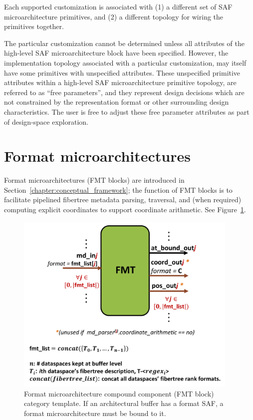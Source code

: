 Each supported customization is associated with (1) a different set of SAF microarchitecture primitives, and (2) a different topology for wiring the primitives together.

The particular customization cannot be determined unless all attributes of the high-level SAF microarchitecture block have been specified. However, the implementation topology associated with a particular customization, may itself have some primitives with unspecified attributes. These unspecified primitive attributes within a high-level SAF microarchitecture primitive topology, are referred to as ``free parameters'', and they represent design decisions which are not constrained by the representation format or other surrounding design characteristics. The user is free to adjust these free parameter attributes as part of design-space exploration.

\section{Format microarchitectures}

Format microarchitectures (FMT blocks) are introduced in Section~\ref{chapter:conceptual_framework}; the function of FMT blocks is to facilitate pipelined fibertree metadata parsing, traversal, and (when required) computing explicit coordinates to support coordinate arithmetic. See Figure~\ref{fig:FMT}.

\begin{figure}[H]
    \centering
    \includegraphics[width=0.95\textwidth]{figures/FMT.pdf}
    \caption{Format microarchitecture compound component (FMT block) category template. If an architectural buffer has a format SAF, a format microarchitecture must be bound to it.}
    \label{fig:FMT}
\end{figure}


